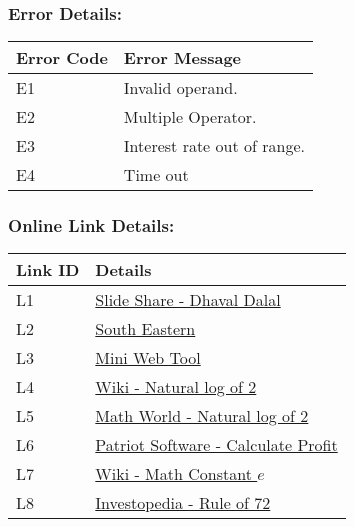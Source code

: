 \documentclass{article}
\begin{document}
\subsubsection{Error Details:}
\begin{table}[h!]
    \begin{tabular}{|| l || l || }
        \hline
        Error Code & Error Message \\
        \hline
        E1 & Invalid operand. \\ 
        \hline
        E2 & Multiple Operator. \\ 
        \hline
        E3 & Interest rate out of range. \\ 
        \hline
        E4 & Time out \\ 
        \hline
    \end{tabular}
\end{table}
\newpage
\subsubsection{Online Link Details:}
\begin{table}[h!]
    \begin{tabular}{|| l || l || }
        \hline
        Link ID & Details \\
        \hline
        L1 & \href{http://www.slideshare.net/DhavalDalal/calculator-stories}{Slide Share - Dhaval Dalal} \\ 
        \hline
        L2 &  \href{http://www2.southeastern.edu/Academics/Faculty/dgurney/Math241/StatTopics/SciNot.htm}{South Eastern} \\
        \hline
        L3 & \href{http://www.miniwebtool.com/}{Mini Web Tool} \\ 
        \hline
        L4 & \href{https://en.wikipedia.org/wiki/Natural_logarithm_of_2}{Wiki - Natural log of 2} \\ 
        \hline
        L5 & \href{http://mathworld.wolfram.com/NaturalLogarithmof2.html}{Math World - Natural log of 2} \\ 
        \hline
        L6 & \href{https://www.patriotsoftware.com/accounting/training/blog/how-do-you-determine-a-profit-margin/}{Patriot Software - Calculate Profit} \\ 
        \hline
        L7 & \href{https://en.wikipedia.org/wiki/E_(mathematical_constant)}{Wiki - Math Constant $e$} \\ 
        \hline
        L8 & \href{https://www.investopedia.com/terms/r/ruleof72.asp}{Investopedia - Rule of 72} \\ 
        \hline
    \end{tabular}
\end{table}
\end{document}
